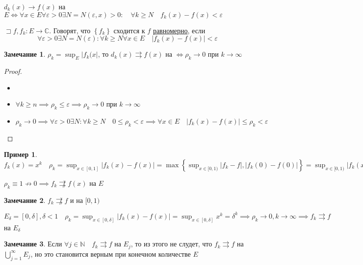 \documentclass{book}
\newcommand\N{\ensuremath{\mathbb{N}}}
\renewcommand\C{\ensuremath{\mathbb{C}}}
\theoremstyle{definition}
\newtheorem*{note}{Замечание}
\newtheorem*{example}{Пример}
\begin{document}
    \begin{definition}
         $d_k(x) \to  f\left(x \right) $ на $E \iff \forall x\in E\forall \varepsilon>0 \exists N = N(\varepsilon, x)>0:\quad \forall k\geqslant N\quad f_k(x) - f(x)<\varepsilon $
    \end{definition}

    \begin{definition}

        $\sqsupset f, f_k: E\to \C$. Говорят, что $\left\{ f_k \right\} $ сходится к $f$ \underline{равномерно}, если \[\forall \varepsilon>0 \exists N = N(\varepsilon): \forall k\geqslant N \forall x\in E\quad |f_k(x)-f(x)| <\varepsilon\]
    \end{definition}

    \begin{note}
        $\rho_k = \sup_E \left| f_k(x \right| $, то $d_k(x) \rightrightarrows f(x)$ на  $\iff \rho_k\to 0$ при $k\to \infty $
    \end{note}
    \begin{proof}
        \begin{itemize}
            \item []
            \item [$\implies $] $\forall k\geqslant n \implies \rho_k \leqslant \varepsilon \implies \rho_k\to 0$ при $k\to \infty $
            \item [$\impliedby $] $\rho_k\to 0 \implies \forall \varepsilon > 0\exists  N: \forall k\geqslant N\quad 0\leqslant \rho_k<\varepsilon \implies \forall x\in E\quad \left| f_k(x) - f(x) \right| \leqslant \rho_k<\varepsilon$
        \end{itemize}
    \end{proof}

    \begin{example}
        $f_k(x) = x^k\quad \rho_k = \sup_{x\in [0,1]} \left| f_k(x) - f(x)\right|= \max\left\{ \sup_{x\in [0,1)}|f_k - f|, |f_k(0) - f(0)| \right\} = \sup_{x\in [0,1)} \left| f_k(x) - f(x) \right|  = \sup_{[0,1)} x^k = \sup_{[0,1]}x^k = 1$

        $\rho_k \equiv 1 \not\to 0 \implies  f_k\not\rightrightarrows f(x)$ на $E$

        \begin{note}
            $f_k\not\rightrightarrows f$ и на  $[0,1)$

        \end{note}
            $E_{\delta} = [0,\delta], \delta < 1\quad \rho_k = \sup_{x\in [0,\delta]} \left| f_k(x) - f(x) \right| = \sup _{x\in [0,\delta]}x^k = \delta^k \implies  \rho_k\to 0, k\to \infty  \implies  f_k\rightrightarrows f$ на $E_{\delta}$
            \begin{note}
                Если $\forall j\in \N \quad f_k\rightrightarrows f$ на $E_j$, то из этого не слудет, что  $f_k\rightrightarrows f$ на  $\bigcup\limits_{j=1}^{\infty }E_j $, но это становится верным при конечном количестве $E$
            \end{note}
    \end{example}
\end{document}
